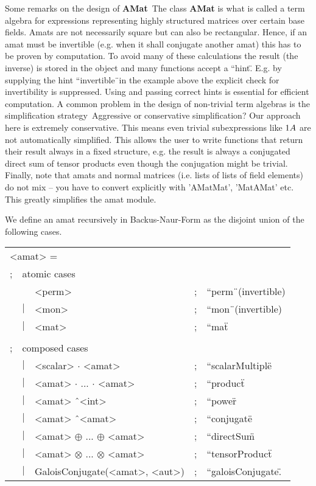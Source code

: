 Some remarks on the design of {\bf AMat}\:\ The class {\bf AMat} is
what is called a term algebra for expressions representing highly
structured matrices over certain base fields. Amats are not
necessarily square but can also be rectangular. Hence, if an amat
must be invertible (e.g. when it shall conjugate another amat) this
has to be proven by computation. To avoid many of these calculations
the result (the inverse) is stored in the object and many functions
accept a ``hint\".  E.g. by supplying the hint ``invertible\"\ in the
example above the explicit check for invertibility is suppressed.
Using and passing correct hints is essential for efficient computation.
A common problem in the design of non-trivial term algebras is the 
simplification strategy\:\ Aggressive or conservative simplification? 
Our approach here is extremely conservative. This means even trivial 
subexpressions like $1\*A$ are not automatically simplified.
This allows the user to write functions that return their result
always in a fixed structure, e.g. the result is always a conjugated
direct sum of tensor products even though the conjugation might be 
trivial.
Finally, note that amats and normal matrices (i.e. lists of lists 
of field elements) do not mix -- you have to convert explicitly
with 'AMatMat', 'MatAMat' etc. This greatly simplifies the 
amat module.

We define an amat recursively in Backus-Naur-Form 
as the disjoint union of the following cases.

\raggedbottom

\begin{tabular}{lllll}
\multicolumn{5}{l}{<amat> \:\:= }\\
 ;  &\multicolumn{4}{l}{atomic cases} \\
 &   & <perm> & ; & ``perm\"\ (invertible)\\
 & $\mid$ & <mon>  & ; & ``mon\"\ (invertible)\\
 & $\mid$ & <mat>  & ; & ``mat\"\\
\\
 ; &\multicolumn{4}{l}{composed cases}\\
 & $\mid$ & <scalar> $\cdot$ <amat>              & ; & ``scalarMultiple\"\\
 & $\mid$ & <amat> $\cdot$ ... $\cdot$ <amat>    & ; & ``product\"\\
 & $\mid$ & <amat> \^\ <int>                      & ; & ``power\"\\
 & $\mid$ & <amat> \^\ <amat>                     & ; & ``conjugate\"\\
 & $\mid$ & <amat> $\oplus$ ... $\oplus$ <amat>  & ; & ``directSum\"\\
 & $\mid$ & <amat> $\otimes$ ... $\otimes$ <amat>& ; & ``tensorProduct\"\\
 & $\mid$ & GaloisConjugate(<amat>, <aut>)       & ; & ``galoisConjugate\".
\end{tabular}

